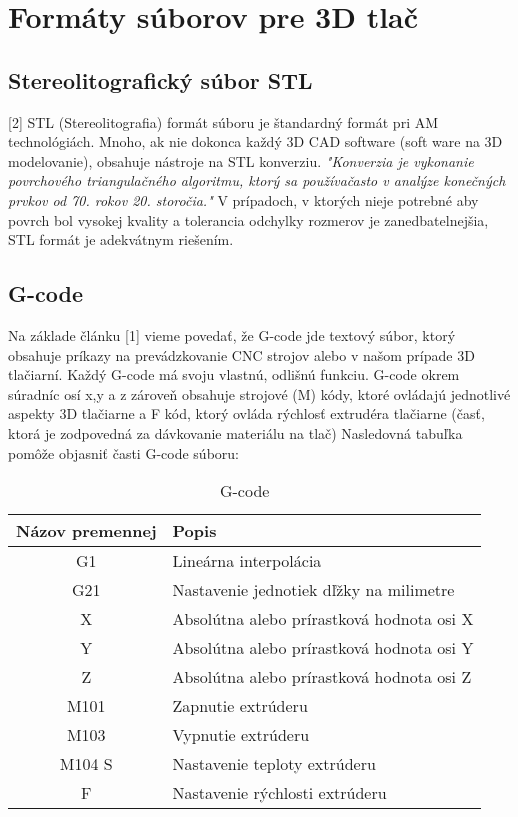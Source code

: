 \documentclass[10pt,twoside,slovak,a4paper]{article}
\begin{document}
\section{Formáty súborov pre 3D tlač}\label{formaty}

\subsection{Stereolitografický súbor STL}\label{formaty:1}
[2] STL (Stereolitografia) formát súboru je štandardný formát pri AM technológiách. Mnoho, ak nie dokonca každý 3D CAD software (soft ware na 3D modelovanie), obsahuje nástroje na STL konverziu.
\emph{"Konverzia je vykonanie povrchového triangulačného algoritmu, ktorý sa používačasto v analýze konečných prvkov od 70. rokov 20. storočia."}
V prípadoch, v ktorých nieje potrebné aby povrch bol vysokej kvality a tolerancia odchylky rozmerov je zanedbatelnejšia, STL formát je adekvátnym riešením.

\subsection{G-code}\label{formaty:2}
Na základe článku [1] vieme povedať, že G-code jde textový súbor, ktorý obsahuje príkazy na prevádzkovanie CNC strojov alebo v našom prípade 3D tlačiarní. Každý G-code má svoju vlastnú, odlišnú funkciu. G-code okrem súradníc osí x,y a z zároveň obsahuje strojové (M) kódy, ktoré ovládajú jednotlivé aspekty 3D tlačiarne a F kód, ktorý ovláda rýchlosť extrudéra tlačiarne (časť, ktorá je zodpovedná za dávkovanie materiálu na tlač)
Nasledovná tabuľka pomôže objasniť časti G-code súboru:

\begin{table}[h]
    \centering
    \begin{tabular}{c|l}
    \textbf{Názov premennej} & \textbf{Popis} \\
    \hline
        G1 & Lineárna interpolácia   \\
        G21 & Nastavenie jednotiek dľžky na milimetre  \\
        X & Absolútna alebo prírastková hodnota osi X  \\
        Y & Absolútna alebo prírastková hodnota osi Y \\
        Z & Absolútna alebo prírastková hodnota osi Z  \\
        M101 & Zapnutie extrúderu  \\
        M103  & Vypnutie extrúderu  \\
        M104 S & Nastavenie teploty extrúderu  \\
        F & Nastavenie rýchlosti extrúderu  \\
    \end{tabular}
    \caption{G-code}
    \label{tab:my_label}
\end{table}
\end{document}
